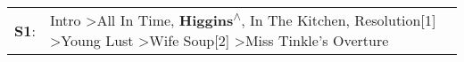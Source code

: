 \begin{supertabular}{p{0.03\textwidth}p{0.92\textwidth}}
 \textbf{S1}:  &  Intro\textsuperscript{} \textgreater \enspace All In Time\textsuperscript{}, \enspace \textbf{Higgins\textsuperscript{$\wedge$}}, \enspace In The Kitchen\textsuperscript{}, \enspace Resolution[1]\textsuperscript{} \textgreater \enspace Young Lust\textsuperscript{} \textgreater \enspace Wife Soup[2]\textsuperscript{} \textgreater \enspace Miss Tinkle's Overture\textsuperscript{}  \enspace  \\
\end{supertabular}
